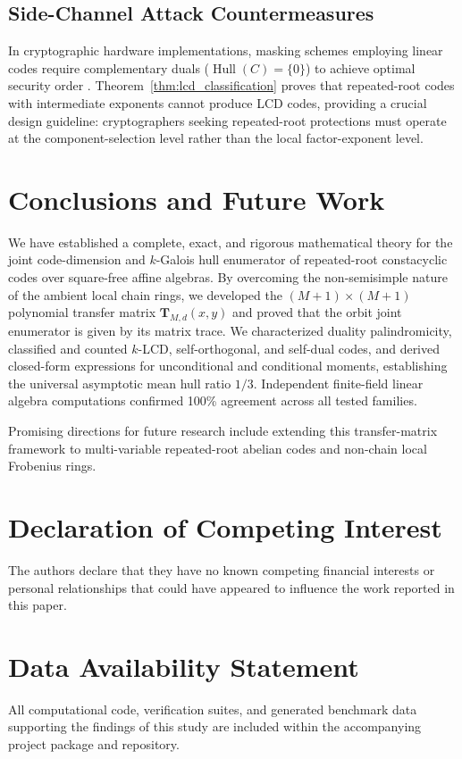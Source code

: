 \documentclass[preprint,12pt]{elsarticle}
\numberwithin{equation}{section}
\theoremstyle{plain}
\theoremstyle{definition}
\theoremstyle{remark}
\begin{document}
\subsection{Side-Channel Attack Countermeasures}
In cryptographic hardware implementations, masking schemes employing linear codes require complementary duals ($\operatorname{Hull}(C) = \{0\}$) to achieve optimal security order \cite{Carlet2018}. Theorem~\ref{thm:lcd_classification} proves that repeated-root codes with intermediate exponents cannot produce LCD codes, providing a crucial design guideline: cryptographers seeking repeated-root protections must operate at the component-selection level rather than the local factor-exponent level.

\section{Conclusions and Future Work}\label{sec:conclusion}

We have established a complete, exact, and rigorous mathematical theory for the joint code-dimension and $k$-Galois hull enumerator of repeated-root constacyclic codes over square-free affine algebras. By overcoming the non-semisimple nature of the ambient local chain rings, we developed the $(M+1) \times (M+1)$ polynomial transfer matrix $\mathbf{T}_{M, d}(x, y)$ and proved that the orbit joint enumerator is given by its matrix trace. We characterized duality palindromicity, classified and counted $k$-LCD, self-orthogonal, and self-dual codes, and derived closed-form expressions for unconditional and conditional moments, establishing the universal asymptotic mean hull ratio $1/3$. Independent finite-field linear algebra computations confirmed 100\% agreement across all tested families.

Promising directions for future research include extending this transfer-matrix framework to multi-variable repeated-root abelian codes and non-chain local Frobenius rings.

\section*{Declaration of Competing Interest}
The authors declare that they have no known competing financial interests or personal relationships that could have appeared to influence the work reported in this paper.

\section*{Data Availability Statement}
All computational code, verification suites, and generated benchmark data supporting the findings of this study are included within the accompanying project package and repository.



\end{document}

